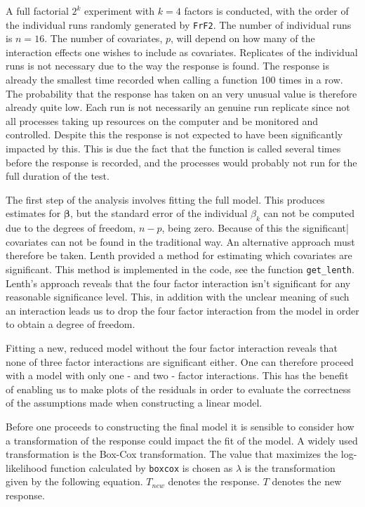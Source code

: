 A full factorial $2^k$ experiment with $k = 4$ factors is conducted, with the order of the individual runs randomly generated by \texttt{FrF2}. The number of individual runs is $n = 16$. The number of covariates, $p$, will depend on how many of the interaction effects one wishes to include as covariates. Replicates of the individual runs is not necessary due to the way the response is found. The response is already the smallest time recorded when calling a function 100 times in a row. The probability that the response has taken on an very unusual value is therefore already quite low. Each run is not necessarily an genuine run replicate since not all processes taking up resources on the computer and be monitored and controlled. Despite this the response is not expected to have been significantly impacted by this. This is due the fact that the function is called several times before the response is recorded, and the processes would probably not run for the full duration of the test. 


The first step of the analysis involves fitting the full model. This produces estimates for $\mathbf{\beta}$, but the standard error of the individual ${\beta}_k$ can not be computed due to the degrees of freedom, $n - p$, being zero. Because of this the significant| covariates can not be found in the traditional way. An alternative approach must therefore be taken. Lenth provided a method for estimating which covariates are significant. This method is implemented in the code, see the function \texttt{get_lenth}. Lenth's approach reveals that the four factor interaction isn't significant for any reasonable significance level. This, in addition with the unclear meaning of such an interaction leads us to drop the four factor interaction from the model in order to obtain a degree of freedom. 

Fitting a new, reduced model without the four factor interaction reveals that none of three factor interactions are significant either. One can therefore proceed with a model with only one - and two - factor interactions. This has the benefit of enabling us to make plots of the residuals in order to evaluate the correctness of the assumptions made when constructing a linear model. 

Before one proceeds to constructing the final model it is sensible to consider how a transformation of the response could impact the fit of the model. A widely used transformation is the Box-Cox transformation. The value that maximizes the log-likelihood function calculated by \texttt{boxcox} is chosen as $\lambda$ is the transformation given by the following equation. $T_{new}$ denotes the response. $T$ denotes the new response.

